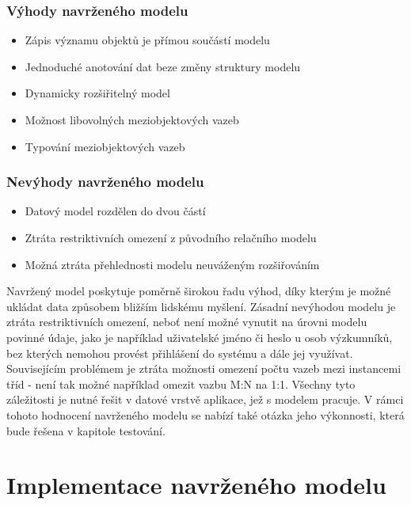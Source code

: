 \documentclass{projekt}
\begin{document}
\subsection{Výhody navrženého modelu}

\begin{itemize}
\item Zápis významu objektů je přímou součástí modelu
\item Jednoduché anotování dat beze změny struktury modelu
\item Dynamicky rozšiřitelný model
\item Možnost libovolných meziobjektových  vazeb
\item Typování meziobjektových vazeb
\end{itemize}


\subsection{Nevýhody navrženého modelu}

\begin{itemize}
\item Datový model rozdělen do dvou částí
\item Ztráta restriktivních omezení z původního relačního modelu
\item Možná ztráta přehlednosti modelu neuváženým rozšiřováním
\end{itemize}

Navržený model poskytuje poměrně širokou řadu výhod, díky kterým je možné ukládat data způsobem bližším lidskému myšlení. Zásadní nevýhodou modelu je ztráta restriktivních omezení, neboť není možné vynutit na úrovni modelu povinné údaje, jako je například uživatelské jméno či heslo u osob výzkumníků, bez kterých nemohou provést přihlášení do systému a dále jej využívat. Souvisejícím problémem je ztráta možnosti omezení počtu vazeb mezi instancemi tříd - není tak možné například omezit vazbu M:N na 1:1. Všechny tyto záležitosti je nutné řešit v datové vrstvě aplikace, jež s modelem pracuje. V rámci tohoto hodnocení navrženého modelu se nabízí také otázka jeho výkonnosti, která bude řešena v kapitole testování.


\chapter{Implementace navrženého modelu}
\end{document}
